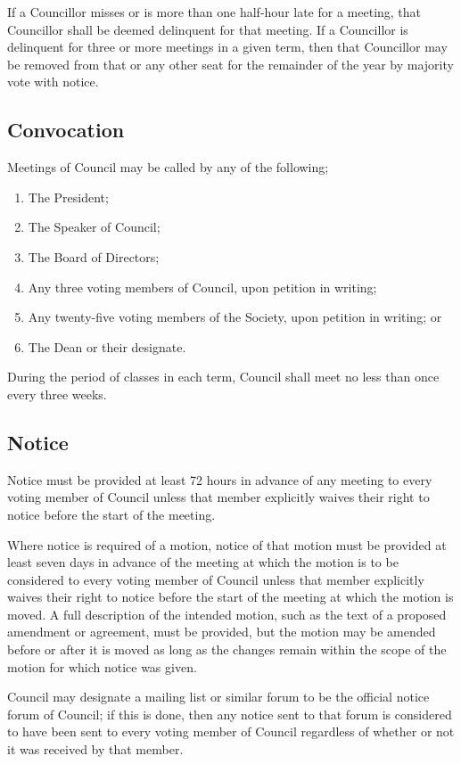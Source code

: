 If a Councillor misses or is more than one half-hour late for a meeting, that
Councillor shall be deemed delinquent for that meeting. If a Councillor is
delinquent for three or more meetings in a given term, then that Councillor may
be removed from that or any other seat for the remainder of the year by
majority vote with notice.

\subsection{Convocation}
Meetings of Council may be called by any of the following;
\begin{enumerate}
  \item The President;
  \item The Speaker of Council;
  \item The Board of Directors;
  \item Any three voting members of Council, upon petition in writing;
  \item Any twenty-five voting members of the Society, upon petition in writing;
    or
  \item The Dean or their designate.
\end{enumerate}

During the period of classes in each term, Council shall meet no less
than once every three weeks.

\subsection{Notice}
Notice must be provided at least 72 hours in advance of any meeting to every
voting member of Council unless that member explicitly waives their
right to notice before the start of the meeting.

Where notice is required of a motion, notice of that motion must be provided at
least seven days in advance of the meeting at which the motion is to be
considered to every voting member of Council unless that member
explicitly waives their right to notice before the start of the meeting at
which the motion is moved. A full description of the intended motion, such as
the text of a proposed amendment or agreement, must be provided, but the motion
may be amended before or after it is moved as long as the changes remain within
the scope of the motion for which notice was given.

Council may designate a mailing list or similar forum to be the
official notice forum of Council; if this is done, then any notice
sent to that forum is considered to have been sent to every voting member of
Council regardless of whether or not it was received by that member.

